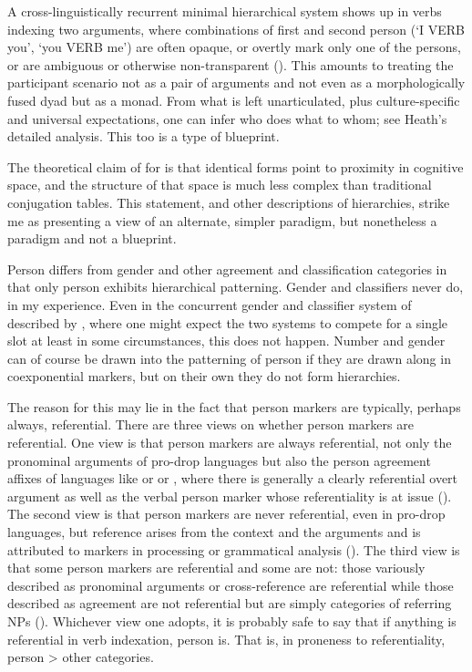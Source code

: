 \documentclass[output=collectionpaper]{langsci/langscibook}
\begin{document}
A cross-linguistically recurrent minimal hierarchical system shows up in verbs indexing two arguments, where combinations of first and second person (`I VERB you', `you VERB me') are often opaque, or overtly mark only one of the persons, or are ambiguous or otherwise non-transparent (\citealt{Heath1991,Heath1998}). This amounts to treating the participant scenario not as a pair of arguments and not even as a morphologically fused dyad but as a monad. From what is left unarticulated, plus culture-specific and universal expectations, one can infer who does what to whom; see Heath's detailed analysis. This too is a type of blueprint.

The theoretical claim of \citet[376]{Kibrik2003} for  is that identical forms point to proximity in cognitive space, and the structure of that space is much less complex than traditional conjugation tables. This statement, and other descriptions of hierarchies, strike me as presenting a view of an alternate, simpler paradigm, but nonetheless a paradigm and not a blueprint.

Person differs from gender and other agreement and classification categories in that only person exhibits hierarchical patterning. Gender and classifiers never do, in my experience. Even in the concurrent gender and classifier system of  described by \citet{Corbett2016}, where one might expect the two systems to compete for a single slot at least in some circumstances, this does not happen. Number and gender can of course be drawn into the patterning of person if they are drawn along in coexponential markers, but on their own they do not form hierarchies.

The reason for this may lie in the fact that person markers are typically, perhaps always, referential. There are three views on whether person markers are referential. One view is that person markers are always referential, not only the pronominal arguments of pro-drop languages but also the person agreement affixes of languages like  or  or , where there is generally a clearly referential overt argument as well as the verbal person marker whose referentiality is at issue (\citealt{Kibrik2011}). The second view is that person markers are never referential, even in pro-drop languages, but reference arises from the context and the arguments and is attributed to markers in processing or grammatical analysis (\citealt{Evans1999,Evans2003}). The third view is that some person markers are referential and some are not: those variously described as pronominal arguments or cross-reference are referential while those described as agreement are not referential but are simply categories of referring NPs (\citealt{Hengeveld2012}). Whichever view one adopts, it is probably safe to say that if anything is referential in verb indexation, person is. That is, in proneness to referentiality, person > other categories.
\end{document}
